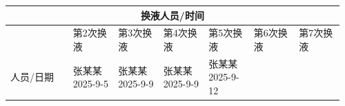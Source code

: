 \documentclass[UTF8,10pt,a4paper,fontset=fandol]{ctexart}
\newcommand{\fieldvalue}[1]{#1}
\newcommand{\handwritten}[1]{#1}
\begin{document}
\begin{center}
\begin{tabular}{|p{0.18\linewidth}|p{0.13\linewidth}|p{0.13\linewidth}|p{0.13\linewidth}|p{0.13\linewidth}|p{0.13\linewidth}|p{0.13\linewidth}|}
\hline
\multicolumn{7}{|c|}{换液人员/时间}\\ \hline
& 第2次换液 & 第3次换液 & 第4次换液 & 第5次换液 & 第6次换液 & 第7次换液 \\ \hline
人员/日期 &
\fieldvalue{\handwritten{张某某}}\newline
\fieldvalue{\handwritten{2025-9-5}}
&
\fieldvalue{\handwritten{张某某}}\newline
\fieldvalue{\handwritten{2025-9-9}}
&
\fieldvalue{\handwritten{张某某}}\newline
\fieldvalue{\handwritten{2025-9-9}}
&
\fieldvalue{\handwritten{张某某}}\newline
\fieldvalue{\handwritten{2025-9-12}}
& & \\ \hline
\end{tabular}
\end{center}
\end{document}
